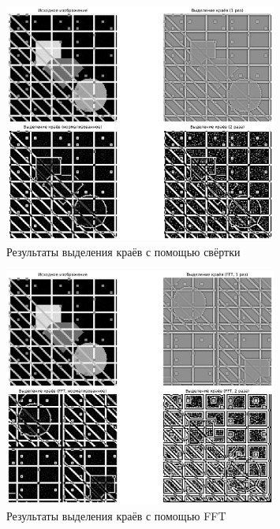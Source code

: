 \begin{figure}[H]
    \centering
    \includegraphics[width=0.8\textwidth]{images/task4/convolution_results.png}
    \caption{Результаты выделения краёв с помощью свёртки}
    \label{fig:convolution_edge}
\end{figure}

\begin{figure}[H]
    \centering
    \includegraphics[width=0.8\textwidth]{images/task4/fft_results.png}
    \caption{Результаты выделения краёв с помощью FFT}
    \label{fig:fft_edge}
\end{figure}

